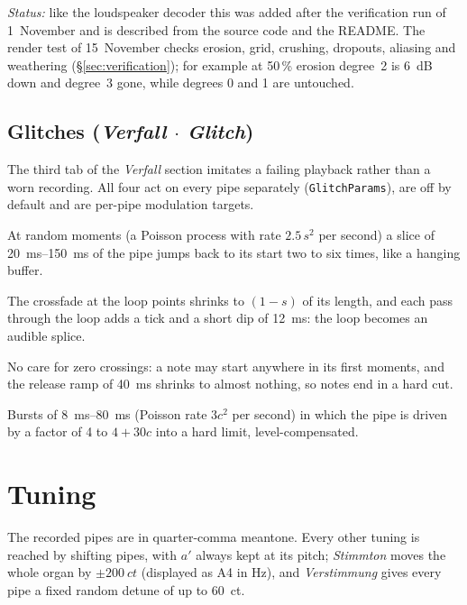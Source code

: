 \documentclass[11pt,a4paper,parskip=half,DIV=11,toc=bibliography]{scrartcl}
\newcommand{\ui}[1]{\emph{#1}}                 %
\newcommand{\fn}[1]{\mbox{\texttt{#1}}}
\begin{document}
\emph{Status:} like the loudspeaker decoder this was added after the verification run of 1~November and is described from the
source code and the README. The render test of 15~November checks erosion, grid, crushing, dropouts, aliasing and weathering
(\S\ref{sec:verification}); for example at 50\,\% erosion degree~2 is \SI{6}{dB} down and degree~3 gone, while degrees 0 and 1 are untouched.

\subsection{Glitches (\ui{Verfall $\cdot$ Glitch})}
\label{sec:glitch}
The third tab of the \ui{Verfall} section imitates a failing playback rather than a worn recording. All four act
on every pipe separately (\fn{GlitchParams}), are off by default and are per-pipe modulation targets.
\begin{description}[style=nextline,leftmargin=1.2em]
\item[{\ui{Stottern} (stutter).}] At random moments (a Poisson process with rate $2.5\,s^2$ per second) a slice of
  \SIrange{20}{150}{ms} of the pipe jumps back to its start two to six times, like a hanging buffer.
\item[{\ui{Bandschnitt} (tape splice).}] The crossfade at the loop points shrinks to $(1-s)$ of its length, and each
  pass through the loop adds a tick and a short dip of \SI{12}{ms}: the loop becomes an audible splice.
\item[{\ui{Harte Kanten} (hard edges).}] No care for zero crossings: a note may start anywhere in its first moments, and the
  release ramp of \SI{40}{ms} shrinks to almost nothing, so notes end in a hard cut.
\item[{\ui{Clipping}.}] Bursts of \SIrange{8}{80}{ms} (Poisson rate $3c^2$ per second) in which the pipe is driven by a
  factor of 4 to $4+30c$ into a hard limit, level-compensated.
\end{description}

\section{Tuning}
\label{sec:tuning}

The recorded pipes are in quarter-comma meantone. Every other tuning is reached by shifting pipes, with
$a'$ always kept at its pitch; \ui{Stimmton} moves the whole organ by $\pm\SI{200}{ct}$ (displayed as
A4 in Hz), and \ui{Verstimmung} gives every pipe a fixed random detune of up to \SI{60}{ct}.
\end{document}
